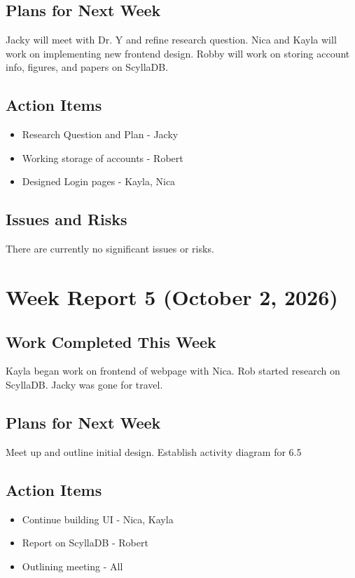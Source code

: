 \subsection{Plans for Next Week}
Jacky will meet with Dr. Y and refine research question. Nica and Kayla will work on implementing new frontend design. Robby will work on storing account info, figures, and papers on ScyllaDB.

\subsection{Action Items}
\begin{itemize}
    \item Research Question and Plan - Jacky
    \item Working storage of accounts - Robert
    \item Designed Login pages - Kayla, Nica
\end{itemize}

\subsection{Issues and Risks}
There are currently no significant issues or risks.

\section{Week Report 5 (October 2, 2026)}
\subsection{Work Completed This Week}
Kayla began work on frontend of webpage with Nica. Rob started research on ScyllaDB. Jacky was gone for travel.

\subsection{Plans for Next Week}
Meet up and outline initial design. Establish activity diagram for 6.5

\subsection{Action Items}
\begin{itemize}
    \item Continue building UI - Nica, Kayla
    \item Report on ScyllaDB - Robert
    \item Outlining meeting - All
\end{itemize}

